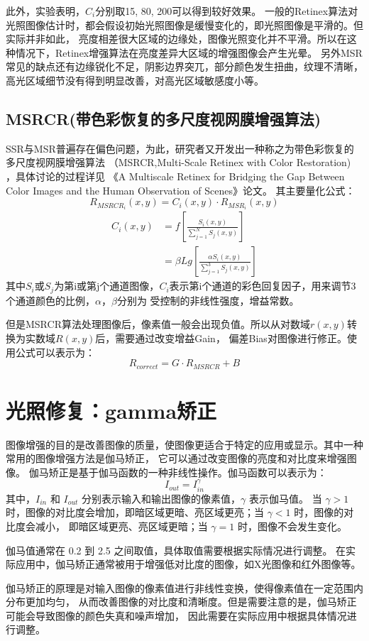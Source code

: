 \documentclass[lang=cn,newtx,10pt,scheme=chinese]{elegantbook}
\begin{document}
    此外，实验表明，$C_i$分别取15, 80, 200可以得到较好效果。
    一般的Retinex算法对光照图像估计时，都会假设初始光照图像是缓慢变化的，即光照图像是平滑的。但实际并非如此，
    亮度相差很大区域的边缘处，图像光照变化并不平滑。所以在这种情况下，Retinex增强算法在亮度差异大区域的增强图像会产生光晕。
    另外MSR常见的缺点还有边缘锐化不足，阴影边界突兀，部分颜色发生扭曲，纹理不清晰，高光区域细节没有得到明显改善，对高光区域敏感度小等。
    
    \subsection{MSRCR(带色彩恢复的多尺度视网膜增强算法)}\label{subsec:msrcr()}
    SSR与MSR普遍存在偏色问题，为此，研究者又开发出一种称之为带色彩恢复的多尺度视网膜增强算法
    （MSRCR,Multi-Scale Retinex with Color Restoration) ，具体讨论的过程详见
    《A Multiscale Retinex for Bridging the Gap Between Color Images and the Human Observation of Scenes》论文。
    其主要量化公式：
    \begin{equation}
        R_{MSRCR_i}(x,y) = C_i(x,y) \cdot R_{MSR_i}(x,y)\label{eq:equation2-6}
    \end{equation}
    \begin{equation}
        \begin{split}
            C_i(x, y) &= f[\frac{S_i(x,y)}{\sum_{j=1}^{N} S_j(x,y)}]\label{eq:equation2-7} \\
                      &= \beta Lg[\frac{\alpha S_i(x,y)}{\sum_{j=1}^{3} S_j(x,y)}]
        \end{split}
    \end{equation}
    其中$S_i$或$S_j$为第i或第j个通道图像，$C_i$表示第i个通道的彩色回复因子，用来调节3个通道颜色的比例，$\alpha$，$\beta$分别为
    受控制的非线性强度，增益常数。

    但是MSRCR算法处理图像后，像素值一般会出现负值。所以从对数域$r(x,y)$转换为实数域$R(x,y)$后，需要通过改变增益Gain，
    偏差Bias对图像进行修正。使用公式可以表示为：
    \begin{equation}
        R_{correct} = G \cdot R_{MSRCR} + B \label{eq:equation2-8}
    \end{equation}

    \section{光照修复：gamma矫正}\label{sec::gama}
    图像增强的目的是改善图像的质量，使图像更适合于特定的应用或显示。其中一种常用的图像增强方法是伽马矫正，
    它可以通过改变图像的亮度和对比度来增强图像。
    伽马矫正是基于伽马函数的一种非线性操作。伽马函数可以表示为：
    \begin{equation}
        I_{out} = I_{in}^\gamma\label{eq:equation2-5}
    \end{equation}
    其中，$I_{in}$ 和 $I_{out}$ 分别表示输入和输出图像的像素值，$\gamma$ 表示伽马值。
    当 $\gamma > 1$ 时，图像的对比度会增加，即暗区域更暗、亮区域更亮；当 $\gamma < 1$ 时，图像的对比度会减小，
    即暗区域更亮、亮区域更暗；当 $\gamma = 1$ 时，图像不会发生变化。

    伽马值通常在 0.2 到 2.5 之间取值，具体取值需要根据实际情况进行调整。
    在实际应用中，伽马矫正通常被用于增强低对比度的图像，如X光图像和红外图像等。

    伽马矫正的原理是对输入图像的像素值进行非线性变换，使得像素值在一定范围内分布更加均匀，
    从而改善图像的对比度和清晰度。但是需要注意的是，伽马矫正可能会导致图像的颜色失真和噪声增加，
    因此需要在实际应用中根据具体情况进行调整。
\end{document}
